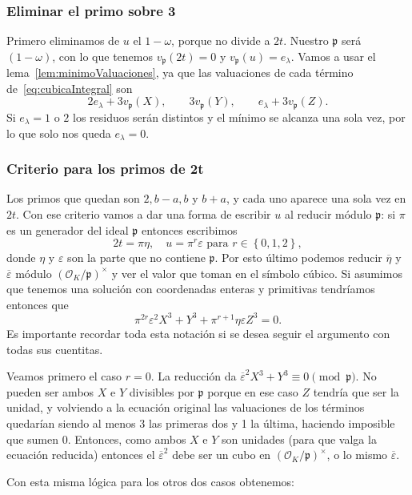 \documentclass[a4paper]{book}
\theoremstyle{definition}
\theoremstyle{plain}
\newcommand{\OO}{\mathcal{O}}
\newcommand{\pp}{\mathfrak{p}}
\newcommand{\lla}{\left\lbrace}
\newcommand{\rla}{\right\rbrace}
\begin{document}
\subsubsection*{Eliminar el primo sobre 3}\label{ej:eliminarLambda}

Primero eliminamos de $u$ el $1-\omega$, porque no divide a $2t$. Nuestro $\pp$ será $(1-\omega)$, con lo que tenemos $v_\pp(2t)=0$ y $v_\pp(u)=e_\lambda$. Vamos a usar el lema~\ref{lem:minimoValuaciones}, ya que las valuaciones de cada término de~\eqref{eq:cubicaIntegral} son
\[
2e_\lambda+3v_\pp(X),\qquad 3v_\pp(Y),\qquad e_\lambda+3v_\pp(Z).
\]
Si $e_\lambda=1$ o $2$ los residuos serán distintos y el mínimo se alcanza una sola vez, por lo que solo nos queda $e_\lambda=0$.

\subsubsection*{Criterio para los primos de 2t}

Los primos que quedan son $2, b-a, b$ y $b+a$, y cada uno aparece una sola vez en $2t$. Con ese criterio vamos a dar una forma de escribir $u$ al reducir módulo $\pp$: si $\pi$ es un generador del ideal $\pp$ entonces escribimos
\[
2t=\pi\eta, \quad u=\pi^r\varepsilon \text{ para } r\in\lla0,1,2\rla,
\]
donde $\eta$ y $\varepsilon$ son la parte que no contiene $\pp$. Por esto último podemos reducir $\overline{\eta}$ y $\overline{\varepsilon}$ módulo ${(\OO_K/\pp)}^\times$ y ver el valor que toman en el símbolo cúbico. Si asumimos que tenemos una solución con coordenadas enteras y primitivas tendríamos entonces que
\[
\pi^{2r}\varepsilon^2X^3+Y^3+\pi^{r+1}\eta\varepsilon Z^3=0.
\]
Es importante recordar toda esta notación si se desea seguir el argumento con todas sus cuentitas.

Veamos primero el caso $r=0$. La reducción da ${\overline\varepsilon}^2 X^3+Y^3 \equiv 0 \pmod\pp$. No pueden ser ambos $X$ e $Y$ divisibles por $\pp$ porque en ese caso $Z$ tendría que ser la unidad, y volviendo a la ecuación original las valuaciones de los términos quedarían siendo al menos 3 las primeras dos y 1 la última, haciendo imposible que sumen 0. Entonces, como ambos $X$ e $Y$ son unidades (para que valga la ecuación reducida) entonces el ${\overline\varepsilon}^2$ debe ser un cubo en ${(\OO_K/\pp)}^\times$, o lo mismo $\overline\varepsilon$.

Con esta misma lógica para los otros dos casos obtenemos:
\end{document}
